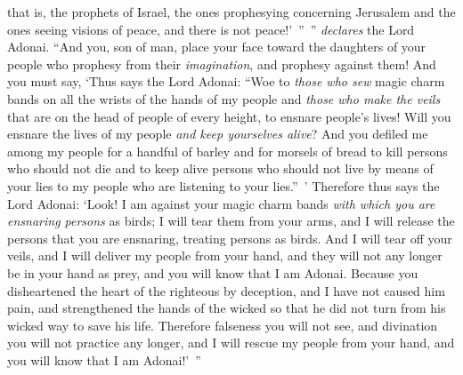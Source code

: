 \begin{biblechapter}
\verse that is, the prophets of Israel, the ones prophesying concerning Jerusalem and the ones seeing visions of peace, and there is not peace!’ ” ” \textit{declares} the Lord Adonai.
\verse “And you, son of man, place your face toward the daughters of your people who prophesy from their \textit{imagination}, and prophesy against them!
\verse And you must say, ‘Thus says the Lord Adonai: “Woe to \textit{those who sew} magic charm bands on all the wrists of the hands of my people and \textit{those who make the veils} that are on the head of people of every height, to ensnare people’s lives! Will you ensnare the lives of my people \textit{and keep yourselves alive}?
\verse And you defiled me among my people for a handful of barley and for morsels of bread to kill persons who should not die and to keep alive persons who should not live by means of your lies to my people who are listening to your lies.” ’
\verse Therefore thus says the Lord Adonai: ‘Look! I am against your magic charm bands \textit{with which you are ensnaring persons} as birds; I will tear them from your arms, and I will release the persons that you are ensnaring, treating persons as birds.
\verse And I will tear off your veils, and I will deliver my people from your hand, and they will not any longer be in your hand as prey, and you will know that I am Adonai.
\verse Because you disheartened the heart of the righteous by deception, and I have not caused him pain, and strengthened the hands of the wicked so that he did not turn from his wicked way to save his life.
\verse Therefore falseness you will not see, and divination you will not practice any longer, and I will rescue my people from your hand, and you will know that I am Adonai!’ ”
\end{biblechapter}

